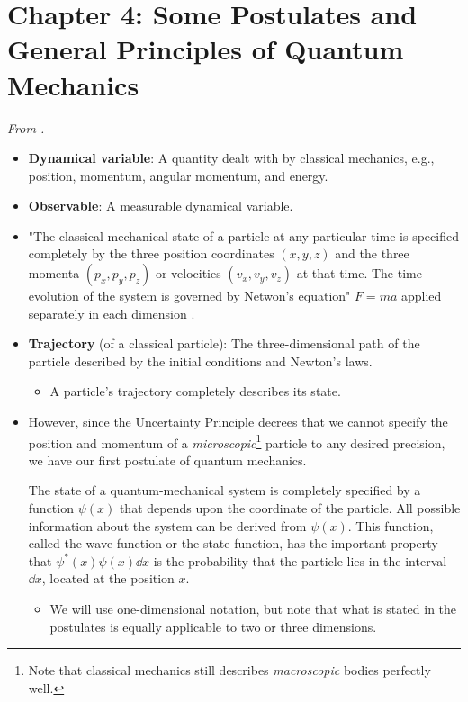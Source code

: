 \documentclass[../notes.tex]{subfiles}
\begin{document}
\section{Chapter 4: Some Postulates and General Principles of Quantum Mechanics}
\emph{From \textcite{bib:McQuarrieSimon}.}
\begin{itemize}
    \item {}\textbf{Dynamical variable}: A quantity dealt with by classical mechanics, e.g., position, momentum, angular momentum, and energy.
    \item \textbf{Observable}: A measurable dynamical variable.
    \item "The classical-mechanical state of a particle at any particular time is specified completely by the three position coordinates $(x,y,z)$ and the three momenta $(p_x,p_y,p_z)$ or velocities $(v_x,v_y,v_z)$ at that time. The time evolution of the system is governed by Netwon's equation" $F=ma$ applied separately in each dimension \parencite[115]{bib:McQuarrieSimon}.
    \item \textbf{Trajectory} (of a classical particle): The three-dimensional path of the particle described by the initial conditions and Newton's laws.
    \begin{itemize}
        \item A particle's trajectory completely describes its state.
    \end{itemize}
    \item However, since the Uncertainty Principle decrees that we cannot specify the position and momentum of a \emph{microscopic}\footnote{Note that classical mechanics still describes \emph{macroscopic} bodies perfectly well.} particle to any desired precision, we have our first postulate of quantum mechanics.
    \begin{postulate}
        The state of a quantum-mechanical system is completely specified by a function $\psi(x)$ that depends upon the coordinate of the particle. All possible information about the system can be derived from $\psi(x)$. This function, called the wave function or the state function, has the important property that $\psi^*(x)\psi(x)\dd{x}$ is the probability that the particle lies in the interval $\dd{x}$, located at the position $x$.
    \end{postulate}
    \begin{itemize}
        \item We will use one-dimensional notation, but note that what is stated in the postulates is equally applicable to two or three dimensions.

\end{itemize}
\end{itemize}
\end{document}
